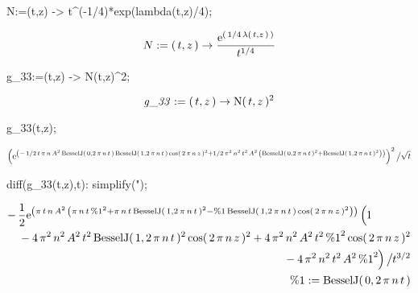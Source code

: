 \begin{mapleinput}
N:=(t,z) -> t^(-1/4)*exp(lambda(t,z)/4);
\end{mapleinput}
\begin{maplelatex}
\[
{N} := (\,{t}, {z}\,) \rightarrow {\displaystyle \frac {{\rm e}^{
(\,1/4\,{ \lambda}(\,{t}, {z}\,)\,)}}{{t}^{1/4}}}
\]
\end{maplelatex}
\begin{mapleinput}
g_33:=(t,z) -> N(t,z)^2;
\end{mapleinput}
\begin{maplelatex}
\[
{\it g\_33} := (\,{t}, {z}\,) \rightarrow {\rm N}(\,{t}, {z}\,)^{
2}
\]
\end{maplelatex}
\begin{mapleinput}
g_33(t,z);
\end{mapleinput}
\begin{maplelatex}
\[
 \left( \! \,{\rm e}^{ \left( \! \, - \,1/2\,{t}\,{ \pi}\,{n}\,{A
}^{2}\,{\rm BesselJ}(\,0, 2\,{ \pi}\,{n}\,{t}\,)\,{\rm BesselJ}(
\,1, 2\,{ \pi}\,{n}\,{t}\,)\,{\rm cos}(\,2\,{ \pi}\,{n}\,{z}\,)^{
2} + 1/2\,{ \pi}^{2}\,{n}^{2}\,{t}^{2}\,{A}^{2}\, \left( \! \,
{\rm BesselJ}(\,0, 2\,{ \pi}\,{n}\,{t}\,)^{2} + {\rm BesselJ}(\,1
, 2\,{ \pi}\,{n}\,{t}\,)^{2}\, \!  \right) \, \!  \right) }\, \! 
 \right) ^{2} \left/ {\vrule height0.41em width0em depth0.41em}
 \right. \! \! \sqrt {{t}}
\]
\end{maplelatex}
\begin{mapleinput}
diff(g_33(t,z),t): simplify(");
\end{mapleinput}
\begin{maplelatex}
\begin{eqnarray*}
\lefteqn{ - \,{\displaystyle \frac {1}{2}}{\rm e}^{ \left( \! \,{
 \pi}\,{t}\,{n}\,{A}^{2}\, \left( \! \,{ \pi}\,{n}\,{t}\,{\rm \%1
}^{2} + { \pi}\,{n}\,{t}\,{\rm BesselJ}(\,1, 2\,{ \pi}\,{n}\,{t}
\,)^{2} - {\rm \%1}\,{\rm BesselJ}(\,1, 2\,{ \pi}\,{n}\,{t}\,)\,
{\rm cos}(\,2\,{ \pi}\,{n}\,{z}\,)^{2}\, \!  \right) \, \! 
 \right) } \left( {\vrule height0.44em width0em depth0.44em}
 \right. \! \! 1} \\
 & & \mbox{} - 4\,{ \pi}^{2}\,{n}^{2}\,{A}^{2}\,{t}^{2}\,{\rm 
BesselJ}(\,1, 2\,{ \pi}\,{n}\,{t}\,)^{2}\,{\rm cos}(\,2\,{ \pi}\,
{n}\,{z}\,)^{2} + 4\,{ \pi}^{2}\,{n}^{2}\,{A}^{2}\,{t}^{2}\,{\rm 
\%1}^{2}\,{\rm cos}(\,2\,{ \pi}\,{n}\,{z}\,)^{2} \\
 & & \mbox{} - 4\,{ \pi}^{2}\,{n}^{2}\,{t}^{2}\,{A}^{2}\,{\rm \%1
}^{2} \! \! \left. {\vrule height0.44em width0em depth0.44em}
 \right)  \left/ {\vrule height0.37em width0em depth0.37em}
 \right. \! \! {t}^{3/2} \\
 & & {\rm \%1} := {\rm BesselJ}(\,0, 2\,{ \pi}\,{n}\,{t}\,)
\end{eqnarray*}
\end{maplelatex}
